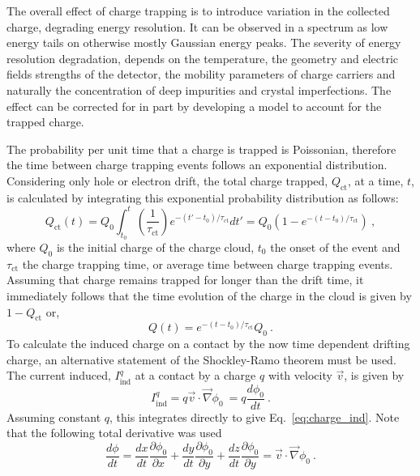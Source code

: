 The overall effect of charge trapping is to introduce variation in the collected charge, degrading energy resolution. It can be observed in a spectrum as low energy tails on otherwise mostly Gaussian energy peaks. The severity of energy resolution degradation, depends on the temperature, the geometry and electric fields strengths of the detector, the mobility parameters of charge carriers and naturally the concentration of deep impurities and crystal imperfections. The effect can be corrected for in part by developing a model to account for the trapped charge.

The probability per unit time that a charge is trapped is Poissonian, therefore the time between charge trapping events follows an exponential distribution. Considering only hole or electron drift, the total charge trapped, $Q_\text{ct}$, at a time, $t$, is calculated by integrating this exponential probability distribution as follows:
\begin{equation}
	Q_\text{ct}(t) = Q_0\int_{t_0}^{t}\left(\frac{1}{\tau_\text{ct}}\right)e^{-(t'-t_0)/\tau_\text{ct}}dt' = Q_0(1-e^{-(t-t_0)/\tau_\text{ct}})~,
\end{equation}
where $Q_0$ is the initial charge of the charge cloud, $t_0$ the onset of the event and $\tau_\text{ct}$ the charge trapping time, or average time between charge trapping events. Assuming that charge remains trapped for longer than the drift time, it immediately follows that the time evolution of the charge in the cloud is given by $1-Q_\text{ct}$ or,
\begin{equation}
	Q(t) = e^{-(t-t_0)/\tau_\text{ct}}Q_0~.
	\label{eq:exp_decay_charge}
\end{equation}
To calculate the induced charge on a contact by the now time dependent drifting charge, an alternative statement of the Shockley-Ramo theorem must be used. The current induced, $I^q_\text{ind}$ at a contact by a charge $q$ with velocity $\vec{v}$, is given by
\begin{equation}
	I^q_\text{ind} = q\vec{v}\cdot\vec{\nabla}\phi_0~ = q\frac{d\phi_0}{dt}~.
	\label{eq:curr_induced_charge}
\end{equation} 
Assuming constant $q$, this integrates directly to give Eq.~\ref{eq:charge_ind}. Note that the following total derivative was used
\begin{equation}
	\frac{d\phi}{dt} = \frac{dx}{dt}\frac{\partial\phi_0}{\partial x} + \frac{dy}{dt}\frac{\partial\phi_0}{\partial y} + \frac{dz}{dt}\frac{\partial\phi_0}{\partial y} = \vec{v}\cdot\vec{\nabla}\phi_0~.
\end{equation}
